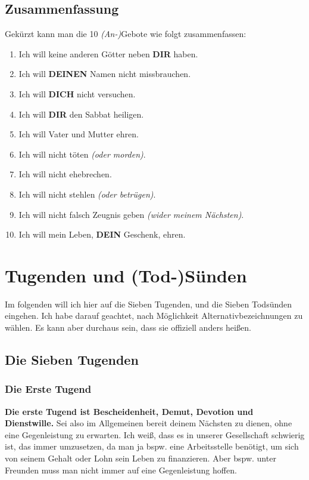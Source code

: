 \documentclass[10pt,a5paper]{article}
\newcommand{\Deinen}[0]{\textbf{DEINEN}}
\newcommand{\Dein}[0]{\textbf{DEIN}}
\newcommand{\Dich}[0]{\textbf{DICH}}
\newcommand{\Dir}[0]{\textbf{DIR}}
\begin{document}
	\subsection{Zusammenfassung}
		Gek\"urzt kann man die 10 \textit{(An-)}Gebote wie folgt zusammenfassen:
		\\
		\begin{enumerate}[nosep]
			\item Ich will keine anderen G\"otter neben {\Dir} haben.
			\item Ich will {\Deinen} Namen nicht missbrauchen.
			\item Ich will {\Dich} nicht versuchen.
			\item Ich will {\Dir} den Sabbat heiligen.
			\item Ich will Vater und Mutter ehren.
			\item Ich will nicht t\"oten \textit{(oder morden)}.
			\item Ich will nicht ehebrechen.
			\item Ich will nicht stehlen \textit{(oder betr\"ugen)}.
			\item Ich will nicht falsch Zeugnis geben \textit{(wider meinem N\"achsten)}.
			\item Ich will mein Leben, {\Dein} Geschenk, ehren.
		\end{enumerate}
	
	\newpage
	\section{Tugenden und (Tod-)S\"unden}
		Im folgenden will ich hier auf die Sieben Tugenden,
		und die Sieben Tods\"unden eingehen.
		Ich habe darauf geachtet,
		nach M\"oglichkeit Alternativbezeichnungen zu w\"ahlen.
		Es kann aber durchaus sein,
		dass sie offiziell anders hei{\ss}en.
	
	\subsection{Die Sieben Tugenden}
	
	\subsubsection{Die Erste Tugend}
		\textbf{Die erste Tugend ist Bescheidenheit,
		Demut,
		Devotion und Dienstwille.}
		Sei also im Allgemeinen bereit deinem N\"achsten zu dienen,
		ohne eine Gegenleistung zu erwarten.
		Ich wei{\ss},
		dass es in unserer Gesellschaft schwierig ist,
		das immer umzusetzen,
		da man ja bspw. eine Arbeitsstelle ben\"otigt,
		um sich von seinem Gehalt oder Lohn sein Leben zu finanzieren.
		Aber bspw. unter Freunden muss man nicht immer auf eine Gegenleistung hoffen.
\end{document}

